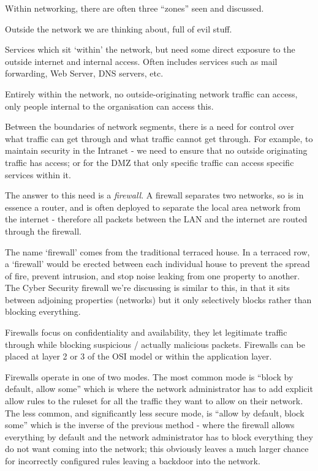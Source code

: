 
Within networking, there are often three ``zones'' seen and discussed.

\begin{define}
    \item[Internet] Outside the network we are thinking about, full of evil stuff.
    \item[Demilitarized Zone (DMZ)] Services which sit `within' the network, but need some direct exposure to the outside internet and internal access. Often includes services such as mail forwarding, Web Server, DNS servers, etc.
    \item[Intranet] Entirely within the network, no outside-originating network traffic can access, only people internal to the organisation can access this. 
\end{define}

Between the boundaries of network segments, there is a need for control over what traffic can get through and what traffic cannot get through. For example, to maintain security in the Intranet - we need to ensure that no outside originating traffic has access; or for the DMZ that only specific traffic can access specific services within it. 

The answer to this need is a \textit{firewall}. A firewall separates two networks, so is in essence a router, and is often deployed to separate the local area network from the internet - therefore all packets between the LAN and the internet are routed through the firewall. 

The name `firewall' comes from the traditional terraced house. In a terraced row, a `firewall' would be erected between each individual house to prevent the spread of fire, prevent intrusion, and stop noise leaking from one property to another. The Cyber Security firewall we're discussing is similar to this, in that it sits between adjoining properties (networks) but it only selectively blocks rather than blocking everything.

Firewalls focus on confidentiality and availability, they let legitimate traffic through while blocking suspicious / actually malicious packets. Firewalls can be placed at layer 2 or 3 of the OSI model or within the application layer.

Firewalls operate in one of two modes. The most common mode is ``block by default, allow some'' which is where the network administrator has to add explicit allow rules to the ruleset for all the traffic they want to allow on their network. The less common, and significantly less secure mode, is ``allow by default, block some'' which is the inverse of the previous method - where the firewall allows everything by default and the network administrator has to block everything they do not want coming into the network; this obviously leaves a much larger chance for incorrectly configured rules leaving a backdoor into the network.

